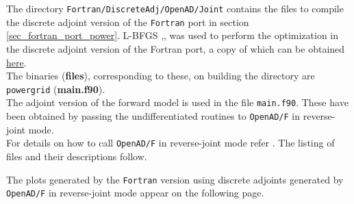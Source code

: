 \noindent The directory \texttt{Fortran/DiscreteAdj/OpenAD/Joint} contains the files to compile the discrete adjoint version of the \texttt{Fortran} port in section \ref{sec_fortran_port_power}. L-BFGS \cite{Byrd_1996},\cite{Zhu_1997},\cite{Morales_2011} was used to perform the optimization in the discrete adjoint version of the Fortran port, a copy of which can be obtained \href{http://users.iems.northwestern.edu/~nocedal/lbfgsb.html}{here}.\\

\noindent The binaries (\textbf{files}), corresponding to these, on building the directory are \texttt{powergrid} (\textbf{{main.f90}}).\\

\noindent The adjoint version of the forward model is used in the file  \texttt{main.f90}. These have been obtained by passing the undifferentiated routines to \texttt{OpenAD/F} in reverse-joint mode.\\

\noindent For details on how to call \texttt{OpenAD/F} in reverse-joint mode refer \cite{Utke_2014}. The listing of files and their descriptions follow.\\


\hfill \break
\noindent The plots generated by the \texttt{Fortran} version using discrete adjoints generated by \texttt{OpenAD/F} in reverse-joint mode appear on the following page.

